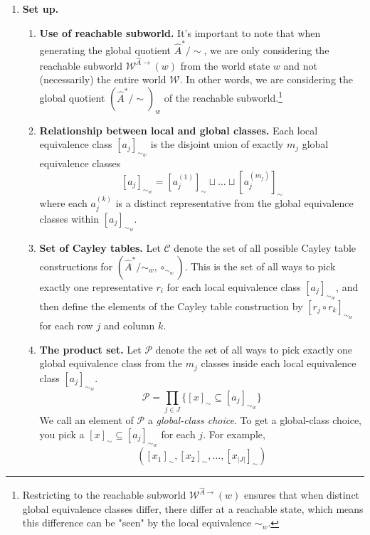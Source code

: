 \begin{proofE}
\begin{enumerate}
    \item \textbf{Set up.}
    \begin{enumerate}
        \item \textbf{Use of reachable subworld.}
        It's important to note that when generating the global quotient $\hat{A}^{*}/\sim$, we are only considering the reachable subworld $\mathscr{W}^{\hat{A}\to}(w)$ from the world state $w$ and not (necessarily) the entire world $\mathscr{W}$.
        In other words, we are considering the global quotient $(\hat{A}^{*}/\sim)_{w}$ of the reachable subworld.\footnote{
        Restricting to the reachable subworld $\mathscr{W}^{\hat{A}\to}(w)$ ensures that when distinct global equivalence classes differ, there differ at a reachable state, which means this difference can be "seen" by the local equivalence $\sim_{w}$.
        }

        \item \textbf{Relationship between local and global classes.}
        Each local equivalence class $[a_{j}]_{\sim_{w}}$ is the disjoint union of exactly $m_{j}$ global equivalence classes
        \begin{equation}\label{eqn:local_class_is_disjoint_union_of_global_classes}
            [a_{j}]_{\sim_{w}} = [a_{j}^{(1)}]_{\sim} \sqcup \dots \sqcup [a_{j}^{(m_{j})}]_{\sim}
        \end{equation}
        where each $a_{j}^{(k)}$ is a distinct representative from the global equivalence classes within $[a_{j}]_{\sim_{w}}$.
    
        \item \textbf{Set of Cayley tables.}
        Let $\mathcal{C}$ denote the set of all possible Cayley table constructions for $(\hat{A}^{*}/\sim_{w}, \circ_{\sim_{w}})$.
        This is the set of all ways to pick exactly one representative $r_{i}$ for each local equivalence class $[a_{j}]_{\sim_{w}}$, and then define the elements of the Cayley table construction by $[r_{j} \circ r_{k}]_{\sim_{w}}$ for each row $j$ and column $k$.

        \item \textbf{The product set.}
        Let $\mathcal{P}$ denote the set of all ways to pick exactly one global equivalence class from the $m_{j}$ classes inside each local equivalence class $[a_{j}]_{\sim_{w}}$.
        \begin{equation}
            \mathcal{P} = \prod_{j \in J} \{ [x]_{\sim} \subseteq [a_{j}]_{\sim_{w}} \}
        \end{equation}
        We call an element of $\mathcal{P}$ a \emph{global-class choice}.
        To get a global-class choice, you pick a $[x]_{\sim} \subseteq [a_{j}]_{\sim_{w}}$ for each $j$.
        For example,
        \begin{equation}
            ([x_{1}]_{\sim}, [x_{2}]_{\sim}, \dots , [x_{|J|}]_{\sim})
        \end{equation}


\end{enumerate}
\end{enumerate}
\end{proofE}

